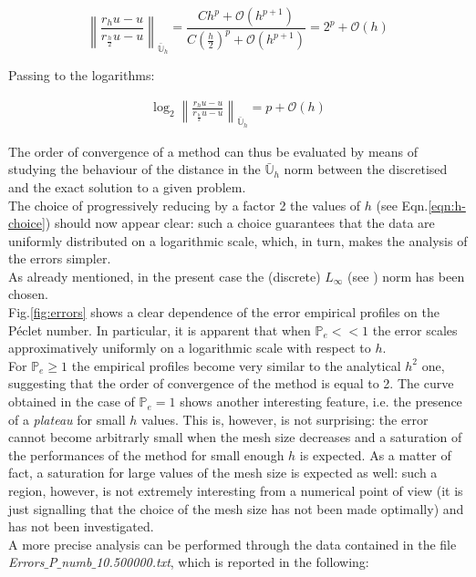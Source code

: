 \documentclass[11pt]{article}
\theoremstyle{theorem}
\theoremstyle{definition}
\begin{document}
$$\left\|\frac{r_hu-u}{r_{\frac{h}{2}}u-u}\right\|_{\bar{\mathbb{U}}_h}=\frac{Ch^p+\mathcal{O}(h^{p+1})}{C\left(\frac{h}{2}\right)^p+\mathcal{O}(h^{p+1})}= 2^p+\mathcal{O}(h)$$

Passing to the logarithms:

\begin{align}
	\label{eqn:log-conv}
	\log_2\left\|\frac{r_hu-u}{r_{\frac{h}{2}}u-u}\right\|_{\bar{\mathbb{U}}_h}=p+\mathcal{O}(h)
\end{align}

The order of convergence of a method can thus be evaluated by means of studying the behaviour of the distance in the $\bar{\mathbb{U}}_h$ norm between the discretised and the exact solution to a given problem.\\
The choice of progressively reducing by a factor 2 the values of $h$ (see Eqn.\eqref{eqn:h-choice}) should now appear clear: such a choice guarantees that the data are uniformly distributed on a logarithmic scale, which, in turn, makes the analysis of the errors simpler.\\
As already mentioned, in the present case the (discrete) $L_{\infty}$ (see \cite{lec-notes}) norm has been chosen.\\


Fig.\ref{fig:errors} shows a clear dependence of the error empirical profiles on the P\'{e}clet number. In particular, it is apparent that when $\mathbb{P}_e<<1$ the error scales approximatively uniformly on a logarithmic scale with respect to $ h $.\\
For $\mathbb{P}_e\ge 1$ the empirical profiles become very similar to the analytical $h^2$ one, suggesting that the order of convergence of the method is equal to 2. The curve obtained in the case of $\mathbb{P}_e=1$ shows another interesting feature, i.e. the presence of a \emph{plateau} for small $h$ values. This is, however, is not surprising: the error cannot become arbitrarly small when the mesh size decreases and a saturation of the performances of the method for small enough $h$ is expected. As a matter of fact, a saturation for large values of the mesh size is expected as well: such a region, however, is not extremely interesting from a numerical point of view (it is just signalling that the choice of the mesh size has not been made optimally) and has not been investigated.\\
A more precise analysis can be performed through the data contained in the file \emph{Errors$\_$P$\_$numb$\_$10.500000.txt}, which is reported in the following:
\\
\\
\\
\\
\\
\end{document}
